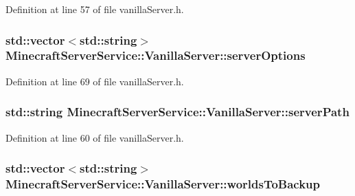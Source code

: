 Definition at line 57 of file vanilla\+Server.\+h.

\subsubsection[{\texorpdfstring{server\+Options}{serverOptions}}]{\setlength{\rightskip}{0pt plus 5cm}std\+::vector$<$std\+::string$>$ Minecraft\+Server\+Service\+::\+Vanilla\+Server\+::server\+Options\hspace{0.3cm}{\ttfamily [protected]}}\hypertarget{class_minecraft_server_service_1_1_vanilla_server_a374f28043dec2295f0b84267fd181bfc}{}\label{class_minecraft_server_service_1_1_vanilla_server_a374f28043dec2295f0b84267fd181bfc}


Definition at line 69 of file vanilla\+Server.\+h.

\subsubsection[{\texorpdfstring{server\+Path}{serverPath}}]{\setlength{\rightskip}{0pt plus 5cm}std\+::string Minecraft\+Server\+Service\+::\+Vanilla\+Server\+::server\+Path\hspace{0.3cm}{\ttfamily [protected]}}\hypertarget{class_minecraft_server_service_1_1_vanilla_server_a5a706e3f6d83ef1eb38ab2c8e2998955}{}\label{class_minecraft_server_service_1_1_vanilla_server_a5a706e3f6d83ef1eb38ab2c8e2998955}


Definition at line 60 of file vanilla\+Server.\+h.

\subsubsection[{\texorpdfstring{worlds\+To\+Backup}{worldsToBackup}}]{\setlength{\rightskip}{0pt plus 5cm}std\+::vector$<$std\+::string$>$ Minecraft\+Server\+Service\+::\+Vanilla\+Server\+::worlds\+To\+Backup\hspace{0.3cm}{\ttfamily [protected]}}\hypertarget{class_minecraft_server_service_1_1_vanilla_server_aec51859d7b2d8699ea1bba8811092414}{}\label{class_minecraft_server_service_1_1_vanilla_server_aec51859d7b2d8699ea1bba8811092414}


